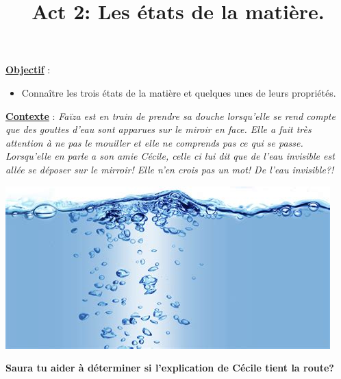 \documentclass[10pt]{article}
\newcommand{\titreActivite}{Act 2: Les états de la matière.} %
\newcommand{\objectif}{ 	
	\begin{itemize}
		\item Connaître les trois états de la matière et quelques unes de leurs propriétés.
	\end{itemize}
} %
\newcommand{\contexte}{
	Faïza est en train de prendre sa douche lorsqu'elle se rend compte que 
	des gouttes d'eau sont apparues sur le miroir en face.
	Elle a fait très attention à ne pas le mouiller et elle ne comprends pas ce qui se passe.
	Lorsqu'elle en parle a son amie Cécile, celle ci lui dit que de l'eau invisible est allée 
	se déposer sur le mirroir! Elle n'en crois pas un mot! De l'eau invisible?!
}
\newcommand{\resumeContexte}{Saura tu aider à déterminer si l'explication de Cécile tient la route?}
\begin{document}
\date{}
\title{\titreActivite}
\maketitle %

\underline{\textbf{Objectif}} :  \vspace{2pt}
\objectif

\vspace{10pt}

\begin{minipage}[c]{0.45\textwidth}
	\centering \underline{\textbf{Contexte}} :  \textit{\contexte}
\end{minipage}
\hspace{ 0pt}
\begin{minipage}[c]{0.45\textwidth}
	\centering \includegraphics[width=0.7\columnwidth]{activite.jpeg} %
\end{minipage}
\vspace{15pt}


	

\textbf{\resumeContexte}
\vspace{-12pt}




\begin{question}
\end{question} 
\end{document}
